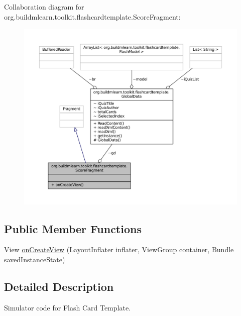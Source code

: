Collaboration diagram for org.\-buildmlearn.\-toolkit.\-flashcardtemplate.\-Score\-Fragment\-:
\nopagebreak
\begin{figure}[H]
\begin{center}
\leavevmode
\includegraphics[width=350pt]{dd/d2f/classorg_1_1buildmlearn_1_1toolkit_1_1flashcardtemplate_1_1ScoreFragment__coll__graph}
\end{center}
\end{figure}
\subsection*{Public Member Functions}
\begin{DoxyCompactItemize}
\item 
View \hyperlink{classorg_1_1buildmlearn_1_1toolkit_1_1flashcardtemplate_1_1ScoreFragment_a5cb863d29628a8e6ae7054ac410aecee}{on\-Create\-View} (Layout\-Inflater inflater, View\-Group container, Bundle saved\-Instance\-State)
\end{DoxyCompactItemize}


\subsection{Detailed Description}
Simulator code for Flash Card Template. 

